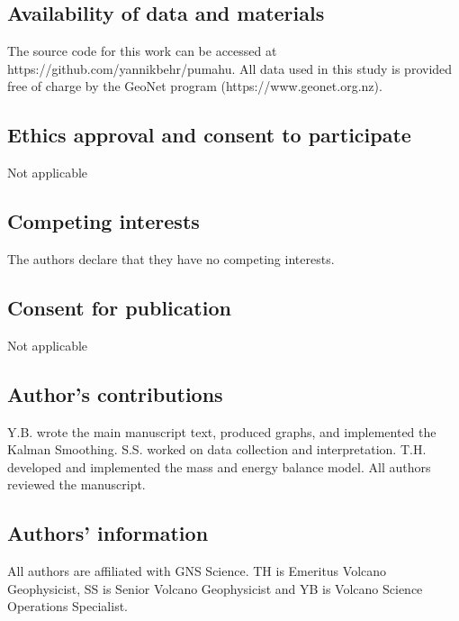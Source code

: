 \documentclass[doublespacing]{bmcart}
\begin{document}
\begin{backmatter}
\subsection*{Availability of data and materials}%
The source code for this work can be accessed at
https://github.com/yannikbehr/pumahu. All data used in this study is provided
free of charge by the GeoNet program (https://www.geonet.org.nz).

\subsection*{Ethics approval and consent to participate}%
Not applicable

\subsection*{Competing interests}
The authors declare that they have no competing interests.

\subsection*{Consent for publication}%
Not applicable

\subsection*{Author's contributions}
  Y.B. wrote the main manuscript text, produced graphs, and implemented the
  Kalman Smoothing. S.S. worked on data collection and interpretation. T.H.
  developed and implemented the mass and energy balance model. All
  authors reviewed the manuscript.

\subsection*{Authors' information}%
All authors are affiliated with GNS Science. TH is Emeritus Volcano
Geophysicist, SS is Senior Volcano Geophysicist and YB is Volcano Science
Operations Specialist.




\end{backmatter}
\end{document}
